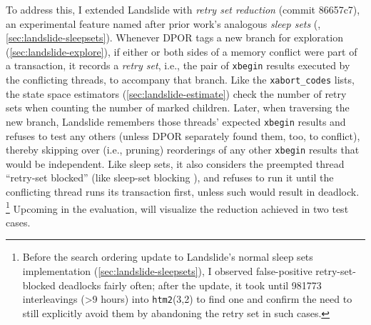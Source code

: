 To address this,
I extended Landslide
with {\em retry set reduction} (commit 86657c7),
an experimental feature named after prior work's analogous {\em sleep sets}
(\cite{partial-order-methods,dpor,optimal-dpor}, \cref{sec:landslide-sleepsets}).
Whenever DPOR tags a new branch for exploration (\cref{sec:landslide-explore}),
if either or both sides of a memory conflict were part of a transaction,
it records a {\em retry set},
i.e., the pair of {\tt xbegin} results executed by the conflicting threads,
to accompany that branch.
Like the {\tt xabort\_codes} lists, the state space estimators (\cref{sec:landslide-estimate})
check the number of retry sets when counting the number of marked children.
Later, when traversing the new branch,
Landslide remembers those threads' expected {\tt xbegin} results
and refuses to test any others
(unless DPOR separately found them, too, to conflict),
thereby skipping over (i.e., pruning) reorderings of any other {\tt xbegin} results that would be independent.
Like sleep sets, it also considers the preempted thread ``retry-set blocked''
(like sleep-set blocking \cite{optimal-dpor}),
and refuses to run it until the conflicting thread runs its transaction first,
unless such would result in deadlock.%
\footnote{
	Before the search ordering update to Landslide's normal sleep sets implementation
	(\cref{sec:landslide-sleepsets}),
	I observed false-positive retry-set-blocked deadlocks fairly often;
	after the update,
	it took until 981773 interleavings (>9 hours) into {\tt htm2}(3,2) to find one
	and confirm the need to still explicitly avoid them by abandoning the retry set in such cases.
}
Upcoming in the evaluation,  will visualize the reduction achieved in two test cases.


